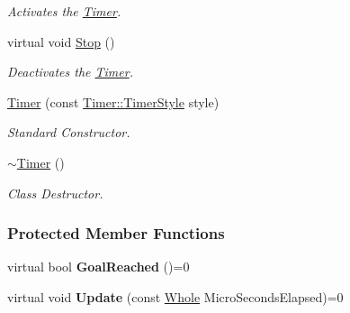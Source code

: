 \begin{DoxyCompactItemize}
\begin{DoxyCompactList}\small\item\em Activates the \hyperlink{classMezzanine_1_1Timer}{Timer}. \item\end{DoxyCompactList}\item 
\hypertarget{classMezzanine_1_1Timer_ac128fca1ea52a5b91295d1dff838074c}{
virtual void \hyperlink{classMezzanine_1_1Timer_ac128fca1ea52a5b91295d1dff838074c}{Stop} ()}
\label{classMezzanine_1_1Timer_ac128fca1ea52a5b91295d1dff838074c}

\begin{DoxyCompactList}\small\item\em Deactivates the \hyperlink{classMezzanine_1_1Timer}{Timer}. \item\end{DoxyCompactList}\item 
\hyperlink{classMezzanine_1_1Timer_af93b23ec9bdd7f88a5d333029edb00d1}{Timer} (const \hyperlink{classMezzanine_1_1Timer_a1db436d4e0d6f1676e41ba3cb2ea3aaa}{Timer::TimerStyle} style)
\begin{DoxyCompactList}\small\item\em Standard Constructor. \item\end{DoxyCompactList}\item 
\hypertarget{classMezzanine_1_1Timer_af9f53c261429f22eaf09ae9d86e8b931}{
\hyperlink{classMezzanine_1_1Timer_af9f53c261429f22eaf09ae9d86e8b931}{$\sim$Timer} ()}
\label{classMezzanine_1_1Timer_af9f53c261429f22eaf09ae9d86e8b931}

\begin{DoxyCompactList}\small\item\em Class Destructor. \item\end{DoxyCompactList}\end{DoxyCompactItemize}
\subsubsection*{Protected Member Functions}
\begin{DoxyCompactItemize}
\item 
\hypertarget{classMezzanine_1_1Timer_abcd1de5126273b78f34e06b9d9ad76d8}{
virtual bool {\bfseries GoalReached} ()=0}
\label{classMezzanine_1_1Timer_abcd1de5126273b78f34e06b9d9ad76d8}

\item 
\hypertarget{classMezzanine_1_1Timer_af30e1b84d6559c1b381fc9c9b2e05d3b}{
virtual void {\bfseries Update} (const \hyperlink{namespaceMezzanine_adcbb6ce6d1eb4379d109e51171e2e493}{Whole} MicroSecondsElapsed)=0}
\label{classMezzanine_1_1Timer_af30e1b84d6559c1b381fc9c9b2e05d3b}

\end{DoxyCompactItemize}
